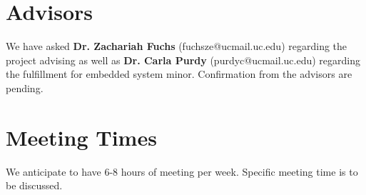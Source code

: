 \documentclass[]{article}
\begin{document}
\section{Advisors}
	We have asked \textbf{Dr. Zachariah Fuchs} (fuchsze@ucmail.uc.edu) regarding the project advising as well as \textbf{Dr. Carla Purdy} (purdyc@ucmail.uc.edu) regarding the fulfillment for embedded system minor. Confirmation from the advisors are pending.

\section{Meeting Times}
	We anticipate to have 6-8 hours of meeting per week. Specific meeting time is to be discussed. 
\end{document}
